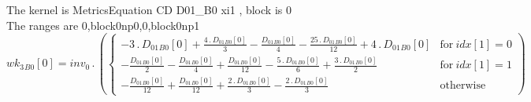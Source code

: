 \documentclass{article}
\begin{document}
\noindent The kernel is MetricsEquation CD D01_B0 xi1 , block is 0\\\noindent The ranges are 0,block0np0,0,block0np1\\\begin{dmath}{wk_{3}{_{B0}}}[{0}] = inv_0 \,.\, \left(\begin{cases} - 3 \,.\, {D_{01}{_{B0}}}[{0}] + \frac{4 \,.\, {D_{01}{_{B0}}}[{0}]}{3} - \frac{{D_{01}{_{B0}}}[{0}]}{4} - \frac{25 \,.\, {D_{01}{_{B0}}}[{0}]}{12} + 4 \,.\, {D_{01}{_{B0}}}[{0}] & 
\text{for}\: {idx}[{1}] = 0 \\- \frac{{D_{01}{_{B0}}}[{0}]}{2} - \frac{{D_{01}{_{B0}}}[{0}]}{4} + \frac{{D_{01}{_{B0}}}[{0}]}{12} - \frac{5 \,.\, {D_{01}{_{B0}}}[{0}]}{6} + \frac{3 \,.\, {D_{01}{_{B0}}}[{0}]}{2} & \text{for}\: {idx}[{1}] = 1 \\- 
\frac{{D_{01}{_{B0}}}[{0}]}{12} + \frac{{D_{01}{_{B0}}}[{0}]}{12} + \frac{2 \,.\, {D_{01}{_{B0}}}[{0}]}{3} - \frac{2 \,.\, {D_{01}{_{B0}}}[{0}]}{3} & \text{otherwise} \end{cases}\right)\end{dmath}
\end{document}
